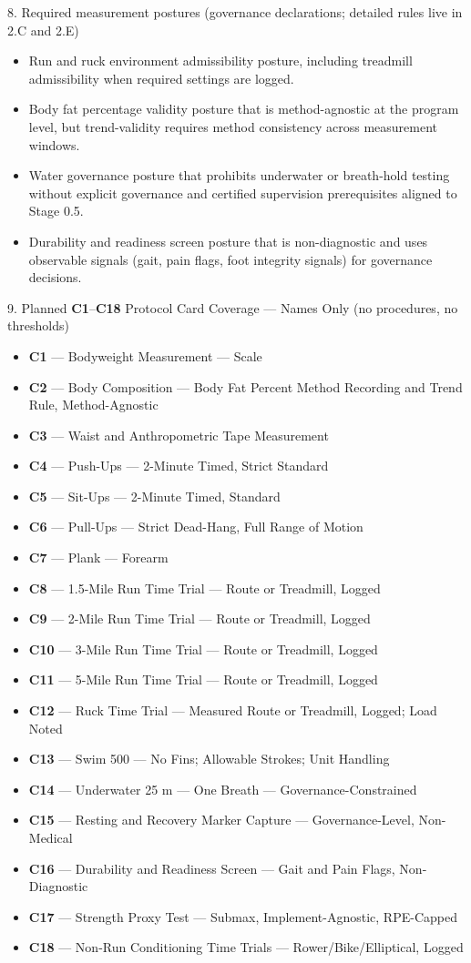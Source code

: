 \documentclass[10pt]{article}
\begin{document}
8. Required measurement postures (governance declarations; detailed rules live in 2.C and 2.E)

\begin{itemize}
\item Run and ruck environment admissibility posture, including treadmill admissibility when required settings are logged.
\item Body fat percentage validity posture that is method-agnostic at the program level, but trend-validity requires method consistency across measurement windows.
\item Water governance posture that prohibits underwater or breath-hold testing without explicit governance and certified supervision prerequisites aligned to Stage 0.5.
\item Durability and readiness screen posture that is non-diagnostic and uses observable signals (gait, pain flags, foot integrity signals) for governance decisions.
\end{itemize}

9. Planned \textbf{C1}–\textbf{C18} Protocol Card Coverage — Names Only (no procedures, no thresholds)

\begin{itemize}
\item \textbf{C1} — Bodyweight Measurement — Scale
\item \textbf{C2} — Body Composition — Body Fat Percent Method Recording and Trend Rule, Method-Agnostic
\item \textbf{C3} — Waist and Anthropometric Tape Measurement
\item \textbf{C4} — Push-Ups — 2-Minute Timed, Strict Standard
\item \textbf{C5} — Sit-Ups — 2-Minute Timed, Standard
\item \textbf{C6} — Pull-Ups — Strict Dead-Hang, Full Range of Motion
\item \textbf{C7} — Plank — Forearm
\item \textbf{C8} — 1.5-Mile Run Time Trial — Route or Treadmill, Logged
\item \textbf{C9} — 2-Mile Run Time Trial — Route or Treadmill, Logged
\item \textbf{C10} — 3-Mile Run Time Trial — Route or Treadmill, Logged
\item \textbf{C11} — 5-Mile Run Time Trial — Route or Treadmill, Logged
\item \textbf{C12} — Ruck Time Trial — Measured Route or Treadmill, Logged; Load Noted
\item \textbf{C13} — Swim 500 — No Fins; Allowable Strokes; Unit Handling
\item \textbf{C14} — Underwater 25 m — One Breath — Governance-Constrained
\item \textbf{C15} — Resting and Recovery Marker Capture — Governance-Level, Non-Medical
\item \textbf{C16} — Durability and Readiness Screen — Gait and Pain Flags, Non-Diagnostic
\item \textbf{C17} — Strength Proxy Test — Submax, Implement-Agnostic, RPE-Capped
\item \textbf{C18} — Non-Run Conditioning Time Trials — Rower/Bike/Elliptical, Logged
\end{itemize}
\end{document}
